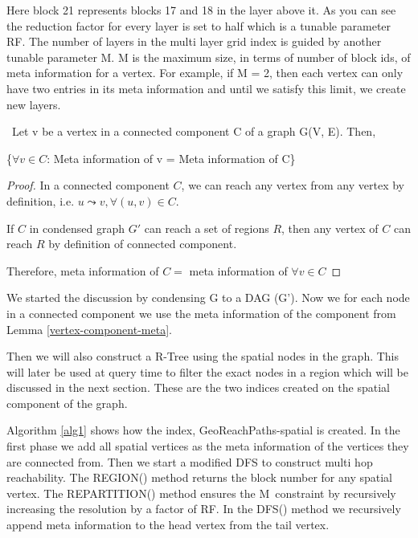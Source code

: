 {Here block 21 represents blocks 17 and 18 in the layer above it. As you can see the reduction factor for every layer is set to half which is a tunable parameter RF. The number of layers in the multi layer grid index is guided by another tunable parameter M. M is the maximum size, in terms of number of block ids, of meta information for a vertex. For example, if M = 2, then each vertex can only have two entries in its meta information and until we satisfy this limit, we create new layers.


\begin{lemma}
\label{vertex-component-meta}
{~Let v be a vertex in a connected component C of a graph G(V, E). Then,}

{\{$\forall v \in C$: Meta information of v = Meta information of C\}}\newline
\end{lemma}

\begin{proof}
In a connected component $C$, we can reach any vertex from any vertex by definition, i.e. $u \leadsto v, \forall (u, v) \in C$. 

If $C$ in condensed graph $G'$ can reach a set of regions $R$, then any vertex of $C$ can reach $R$ by definition of connected component.

Therefore, meta information of $C =$ meta information of $\forall v \in C$
\end{proof}

{We started the discussion by condensing G to a DAG (G'). Now we for
each node in a connected component we use the meta information of the
component from Lemma \ref{vertex-component-meta}.}

Then we will also construct a R-Tree using the spatial nodes in the graph. This will later be used at query time to filter the exact nodes in a region which will be discussed in the next section. These are the two indices created on the spatial component of the graph.

{Algorithm \ref{alg1} shows how the index, GeoReachPaths-spatial is created. In the first phase we add all spatial vertices as the meta information of the vertices they are connected from. Then we start a modified DFS to construct multi hop reachability. The REGION() method returns the block number for any spatial vertex. The REPARTITION() method ensures the }{M}{~constraint by recursively increasing the resolution by a factor of }{RF}{. In the DFS() method we recursively append meta information to the head vertex from the tail vertex.}

}
